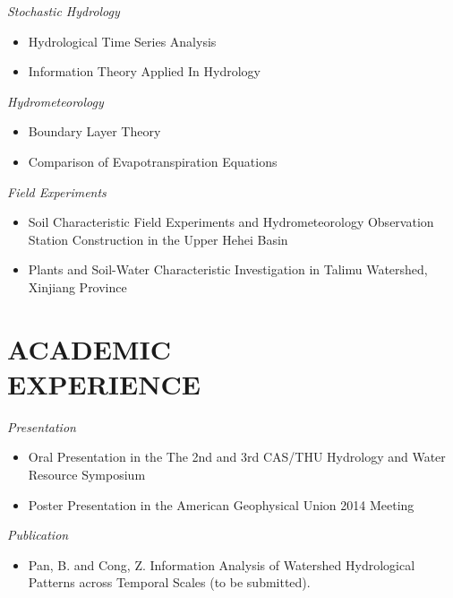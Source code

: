 \documentclass[margin]{res}
\begin{document}
\begin{resume}
                {\sl Stochastic Hydrology}  \\
                 \begin{itemize}  \itemsep -2pt %
                 \item Hydrological Time Series Analysis
                 \item Information Theory Applied In Hydrology
                 
                 \end{itemize} 
                 {\sl Hydrometeorology}  \\
                 \begin{itemize}  \itemsep -2pt %
                 \item Boundary Layer Theory
                 \item Comparison of Evapotranspiration Equations 
                 
                 \end{itemize} 
                 {\sl Field Experiments}  \\
                 \begin{itemize}  \itemsep -2pt %
                 \item Soil Characteristic Field Experiments and Hydrometeorology Observation Station Construction in the Upper Hehei Basin  
                 \item Plants and Soil-Water Characteristic Investigation in Talimu Watershed, Xinjiang Province 
                 
                 \end{itemize} 
                 \section{ACADEMIC\\EXPERIENCE}  
 {\it Presentation\\} 
 \begin{itemize}
 \item Oral Presentation in the The 2nd and 3rd CAS/THU Hydrology and Water Resource Symposium
 \item Poster Presentation in the American Geophysical Union 2014 Meeting
 \end{itemize}
  {\it Publication\\} 
  \begin{itemize}
  \item Pan, B. and Cong, Z.  Information Analysis of Watershed Hydrological Patterns across Temporal Scales (to be submitted). 
  \end{itemize}
 

\end{resume}
\end{document}
